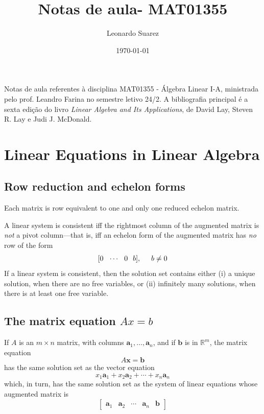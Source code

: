 \documentclass{article}
\title{Notas de aula- MAT01355}
\author{Leonardo Suarez}
\date{\today}
\begin{document}
\maketitle

Notas de aula referentes à disciplina MAT01355 - Álgebra Linear I-A, ministrada pelo prof. Leandro Farina no semestre letivo 24/2. A bibliografia principal é a sexta edição do livro \textit{Linear Algebra and Its Applications}, de David Lay, Steven R. Lay e Judi J. McDonald.

\tableofcontents

\section{Linear Equations in Linear Algebra}

\subsection{Row reduction and echelon forms}

\begin{thm} 
    Each matrix is row equivalent to one and only one reduced echelon matrix.
\end{thm}

\begin{thm} 
    A linear system is consistent iff the rightmost column of the augmented matrix is \textit{not} a pivot column---that is, iff an echelon form of the augmented matrix has \textit{no} row of the form \[[0\hspace{.25cm}\cdots\hspace{.25cm}0\hspace{.25cm} b],\hspace{.5cm}b\neq0\] If a linear system is consistent, then the solution set contains either (i) a unique solution, when there are no free variables, or (ii) infinitely many solutions, when there is at least one free variable.
\end{thm}

\subsection{The matrix equation $Ax=b$}

\begin{thm}
    If $A$ is an \(m\times n\) matrix, with columns $\textbf{a}_1,\ldots,\textbf{a}_n$, and if $\textbf{b}$ is in $\mathbb{R}^m$, the matrix equation $$A\textbf{x}=\textbf{b}$$ has the same solution set as the vector equation $$x_1\textbf{a}_1+x_2\textbf{a}_2+\cdots+x_n\textbf{a}_n$$ which, in turn, has the same solution set as the system of linear equations whose augmented matrix is
    \[
    \begin{bmatrix}
        \textbf{a}_1 & \textbf{a}_2 & \cdots & \textbf{a}_n & \textbf{b}
    \end{bmatrix}
    \]
\end{thm}
\end{document}

